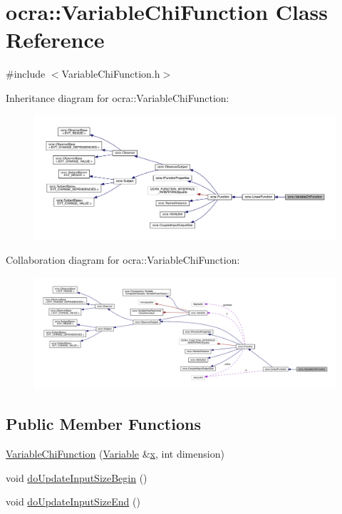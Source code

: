 \hypertarget{classocra_1_1VariableChiFunction}{}\section{ocra\+:\+:Variable\+Chi\+Function Class Reference}
\label{classocra_1_1VariableChiFunction}


{\ttfamily \#include $<$Variable\+Chi\+Function.\+h$>$}



Inheritance diagram for ocra\+:\+:Variable\+Chi\+Function\+:\nopagebreak
\begin{figure}[H]
\begin{center}
\leavevmode
\includegraphics[width=350pt]{d6/d43/classocra_1_1VariableChiFunction__inherit__graph}
\end{center}
\end{figure}


Collaboration diagram for ocra\+:\+:Variable\+Chi\+Function\+:\nopagebreak
\begin{figure}[H]
\begin{center}
\leavevmode
\includegraphics[width=350pt]{d8/d70/classocra_1_1VariableChiFunction__coll__graph}
\end{center}
\end{figure}
\subsection*{Public Member Functions}
\begin{DoxyCompactItemize}
\item 
\hyperlink{classocra_1_1VariableChiFunction_ac83eecf18f118396efdb5513923eeba6}{Variable\+Chi\+Function} (\hyperlink{classocra_1_1Variable}{Variable} \&\hyperlink{classocra_1_1Function_a28825886d1f149c87b112ec2ec1dd486}{x}, int dimension)
\item 
void \hyperlink{classocra_1_1VariableChiFunction_ad58b8fbb68e8cb27aab585f40875918f}{do\+Update\+Input\+Size\+Begin} ()
\item 
void \hyperlink{classocra_1_1VariableChiFunction_adbc1bb06d86e8ef65e8cdeb55db15353}{do\+Update\+Input\+Size\+End} ()
\end{DoxyCompactItemize}
